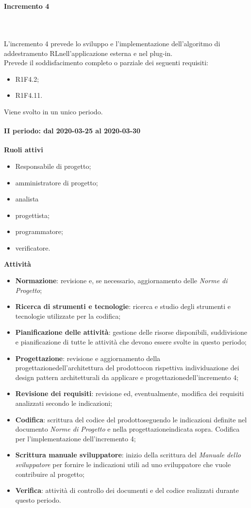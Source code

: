 \paragraph{Incremento 4} \mbox{} \\ \\
L'incremento 4 prevede lo sviluppo e l'implementazione dell'algoritmo di addestramento RL\glosp nell'applicazione esterna e nel plug-in.
\\Prevede il soddisfacimento completo o parziale dei seguenti requisiti:
\begin{itemize}
	\item R1F4.2;
	\item R1F4.11. 
\end{itemize}
Viene svolto in un unico periodo.
\mbox{} \\ \\ \textbf{II periodo: dal 2020-03-25 al 2020-03-30} \mbox{} \\ \\
\textbf{Ruoli attivi}
\begin{itemize}
	\item Responsabile di progetto\glo;
	\item amministratore di progetto\glo;
	\item analista
	\item progettista;
	\item programmatore;
	\item verificatore.
\end{itemize}
\textbf{Attività} 
\begin{itemize}
	\item \textbf{Normazione}: revisione e, se necessario, aggiornamento delle \textit{Norme di Progetto};
	\item \textbf{Ricerca di strumenti e tecnologie}: ricerca e studio degli strumenti e tecnologie utilizzate per la codifica;
	\item \textbf{Pianificazione delle attività}: gestione delle risorse disponibili, suddivisione e pianificazione di tutte le attività che devono essere svolte in questo periodo;
	\item \textbf{Progettazione}\glo: revisione e aggiornamento della progettazione\glosp dell'architettura del prodotto\glosp con rispettiva individuazione dei design pattern architetturali da applicare e progettazione\glosp dell'incremento 4; 
	\item \textbf{Revisione dei requisiti}: revisione ed, eventualmente, modifica dei requisiti analizzati secondo le indicazioni; 
	\item \textbf{Codifica}: scrittura del codice del prodotto\glosp seguendo le indicazioni definite nel documento \textit{Norme di Progetto} e nella progettazione\glosp indicata sopra. Codifica per l'implementazione dell'incremento 4;
	\item \textbf{Scrittura manuale sviluppatore}: inizio della scrittura del \textit{Manuale dello sviluppatore} per fornire le indicazioni utili ad uno sviluppatore che vuole contribuire al progetto\glo; 
	\item \textbf{Verifica}: attività di controllo dei documenti e del codice realizzati durante questo periodo.
\end{itemize}
